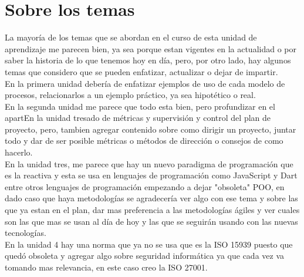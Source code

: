 \documentclass[12pt,twoside]{article}
\begin{document}
\section{Sobre los temas}

La mayoría de los temas que se abordan en el curso de esta unidad de aprendizaje me parecen bien,
ya sea porque estan vigentes en la actualidad o por saber la historia de lo que tenemos 
hoy en día, pero, por otro lado, hay algunos temas que considero que se pueden enfatizar, actualizar
o dejar de impartir.\\

En la primera unidad debería de enfatizar ejemplos de uso de cada modelo de procesos,
relacionarlos a un ejemplo práctico, ya sea hipotético o real.\\

En la segunda unidad me parece que todo esta bien, pero profundizar en el apartEn la unidad tresado de métricas
y supervisión y control del plan de proyecto, pero, tambien agregar contenido sobre como dirigir
un proyecto, juntar todo y dar de ser posible métricas o métodos de dirección o consejos
de como hacerlo.\\

En la unidad tres, me parece que hay un nuevo paradigma de programación que es la reactiva y esta
se usa en lenguajes de programación como JavaScript y Dart entre otros lenguajes de programación
empezando a dejar "obsoleta" POO, en dado caso que haya metodologías se agradecería ver algo
con ese tema y sobre las que ya estan en el plan, dar mas preferencia a las metodologías
ágiles y ver cuales son las que mas se usan al día de hoy y las que se seguirán usando 
con las nuevas tecnologías.\\

En la unidad 4 hay una norma que ya no se usa que es la ISO 15939 puesto que quedó obsoleta
y agregar algo sobre seguridad informática ya que cada vez va tomando mas relevancia, en este
caso creo la ISO 27001.\\
\end{document}
